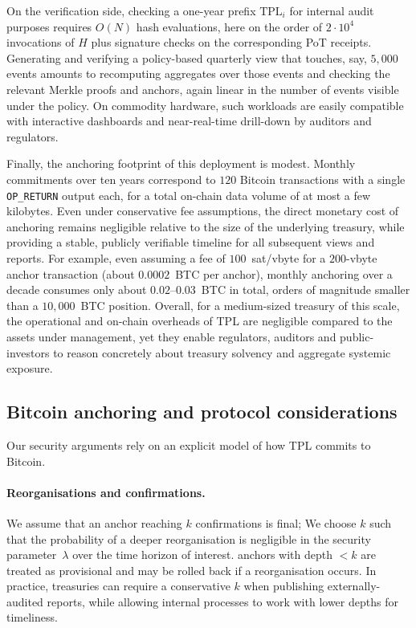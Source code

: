 \documentclass[11pt]{article}
\begin{document}
On the verification side, checking a one-year prefix $\mathrm{TPL}_i$ for internal audit purposes requires
$O(N)$ hash evaluations, here on the order of $2\cdot 10^4$ invocations of $H$ plus signature checks on the
corresponding PoT receipts.
Generating and verifying a policy-based quarterly view that touches, say, $5{,}000$ events amounts to recomputing
aggregates over those events and checking the relevant Merkle proofs and anchors, again linear in the number of events
visible under the policy.
On commodity hardware, such workloads are easily compatible with interactive dashboards and near-real-time drill-down
by auditors and regulators.

Finally, the anchoring footprint of this deployment is modest.
Monthly commitments over ten years correspond to $120$ Bitcoin transactions with a single \texttt{OP\_RETURN} output each,
for a total on-chain data volume of at most a few kilobytes.
Even under conservative fee assumptions, the direct monetary cost of anchoring remains negligible relative to the size
of the underlying treasury, while providing a stable, publicly verifiable timeline for all subsequent views and reports. For example, even assuming a fee of $100$~sat/vbyte for a $200$-vbyte anchor transaction (about $0.0002$~BTC per anchor), monthly anchoring over a decade consumes only about $0.02$--$0.03$~BTC in total, orders of magnitude smaller than a $10{,}000$~BTC position. Overall, for a medium-sized treasury of this scale, the operational and on-chain overheads of TPL are negligible compared to the assets under management, yet they enable regulators, auditors and public-investors to reason concretely about treasury solvency and aggregate systemic exposure.
\subsection{Bitcoin anchoring and protocol considerations}

Our security arguments rely on an explicit model of how TPL commits to Bitcoin.

\paragraph{Reorganisations and confirmations.}
We assume that an anchor reaching $k$ confirmations is final; We choose $k$ such that the probability of a deeper reorganisation is negligible in the security parameter~$\lambda$ over the time horizon of interest. anchors with depth $< k$ are treated as provisional and may be rolled back if a reorganisation occurs.
In practice, treasuries can require a conservative $k$ when publishing externally-audited reports, while allowing internal processes to work with lower depths for timeliness.
\end{document}
